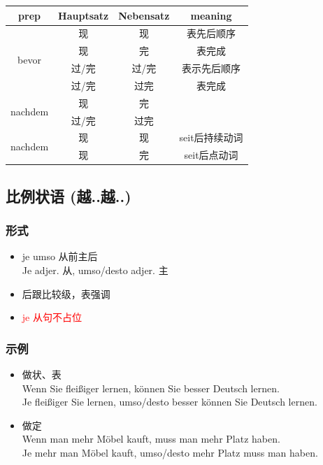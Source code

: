 \begin{center}
    \begin{tabular}{|c|c|c|c|}
        \hline
        \rowcolor{gray}
        prep                     & Hauptsatz & Nebensatz & meaning   \\
        \hline
        \multirow{4}{*}{bevor}   & 现         & 现         & 表先后顺序     \\
                                 & 现         & 完         & 表完成       \\
        \cline{2-4}
                                 & 过/完       & 过/完       & 表示先后顺序    \\
                                 & 过/完       & 过完        & 表完成       \\
        \hline
        \multirow{2}{*}{nachdem} & 现         & 完         &           \\
                                 & 过/完       & 过完        &           \\
        \hline
        \multirow{2}{*}{nachdem} & 现         & 现         & seit后持续动词 \\
                                 & 现         & 完         & seit后点动词  \\
        \hline
    \end{tabular}
\end{center}

\subsection{比例状语 (越..越..)}
\subsubsection{形式}
\begin{itemize}
    \item je umso 从前主后 \\
          Je adjer. 从, umso/desto adjer. 主
    \item 后跟比较级，表强调
    \item \textcolor{red}{je 从句不占位}
\end{itemize}

\subsubsection{示例}
\begin{itemize}
    \item 做状、表 \\
          Wenn Sie fleißiger lernen, können Sie besser Deutsch lernen. \\
          Je fleißiger Sie lernen, umso/desto besser können Sie Deutsch lernen.
    \item 做定 \\
          Wenn man mehr Möbel kauft, muss man mehr Platz haben. \\
          Je mehr man Möbel kauft, umso/desto mehr Platz muss man haben.
\end{itemize}


